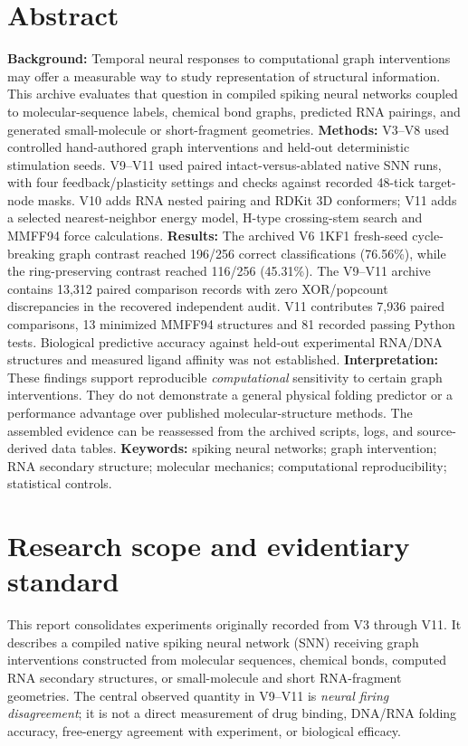 \documentclass[11pt,a4paper]{article}
\begin{document}
\section*{Abstract}
\textbf{Background:} Temporal neural responses to computational graph interventions may offer a measurable way to study representation of structural information. This archive evaluates that question in compiled spiking neural networks coupled to molecular-sequence labels, chemical bond graphs, predicted RNA pairings, and generated small-molecule or short-fragment geometries.
\textbf{Methods:} V3--V8 used controlled hand-authored graph interventions and held-out deterministic stimulation seeds. V9--V11 used paired intact-versus-ablated native SNN runs, with four feedback/plasticity settings and checks against recorded 48-tick target-node masks. V10 adds RNA nested pairing and RDKit 3D conformers; V11 adds a selected nearest-neighbor energy model, H-type crossing-stem search and MMFF94 force calculations.
\textbf{Results:} The archived V6 1KF1 fresh-seed cycle-breaking graph contrast reached 196/256 correct classifications (76.56\%), while the ring-preserving contrast reached 116/256 (45.31\%). The V9--V11 archive contains 13,312 paired comparison records with zero XOR/popcount discrepancies in the recovered independent audit. V11 contributes 7,936 paired comparisons, 13 minimized MMFF94 structures and 81 recorded passing Python tests. Biological predictive accuracy against held-out experimental RNA/DNA structures and measured ligand affinity was not established.
\textbf{Interpretation:} These findings support reproducible \emph{computational} sensitivity to certain graph interventions. They do not demonstrate a general physical folding predictor or a performance advantage over published molecular-structure methods. The assembled evidence can be reassessed from the archived scripts, logs, and source-derived data tables.
\textbf{Keywords:} spiking neural networks; graph intervention; RNA secondary structure; molecular mechanics; computational reproducibility; statistical controls.
\clearpage


\section{Research scope and evidentiary standard}
This report consolidates experiments originally recorded from V3 through V11. It describes a compiled native spiking neural network (SNN) receiving graph interventions constructed from molecular sequences, chemical bonds, computed RNA secondary structures, or small-molecule and short RNA-fragment geometries. The central observed quantity in V9--V11 is \emph{neural firing disagreement}; it is not a direct measurement of drug binding, DNA/RNA folding accuracy, free-energy agreement with experiment, or biological efficacy.
\end{document}
